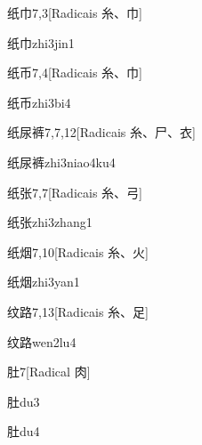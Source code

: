 \begin{entry}{纸巾}{7,3}[Radicais ⽷、⼱]
  \begin{phonetics}{纸巾}{zhi3jin1}
  \end{phonetics}
\end{entry}

\begin{entry}{纸币}{7,4}[Radicais ⽷、⼱]
  \begin{phonetics}{纸币}{zhi3bi4}
  \end{phonetics}
\end{entry}

\begin{entry}{纸尿裤}{7,7,12}[Radicais ⽷、⼫、⾐]
  \begin{phonetics}{纸尿裤}{zhi3niao4ku4}
  \end{phonetics}
\end{entry}

\begin{entry}{纸张}{7,7}[Radicais ⽷、⼸]
  \begin{phonetics}{纸张}{zhi3zhang1}
  \end{phonetics}
\end{entry}

\begin{entry}{纸烟}{7,10}[Radicais ⽷、⽕]
  \begin{phonetics}{纸烟}{zhi3yan1}
  \end{phonetics}
\end{entry}

\begin{entry}{纹路}{7,13}[Radicais ⽷、⾜]
  \begin{phonetics}{纹路}{wen2lu4}
  \end{phonetics}
\end{entry}

\begin{entry}{肚}{7}[Radical ⾁]
  \begin{phonetics}{肚}{du3}
  \end{phonetics}
  \begin{phonetics}{肚}{du4}
  \end{phonetics}
\end{entry}

